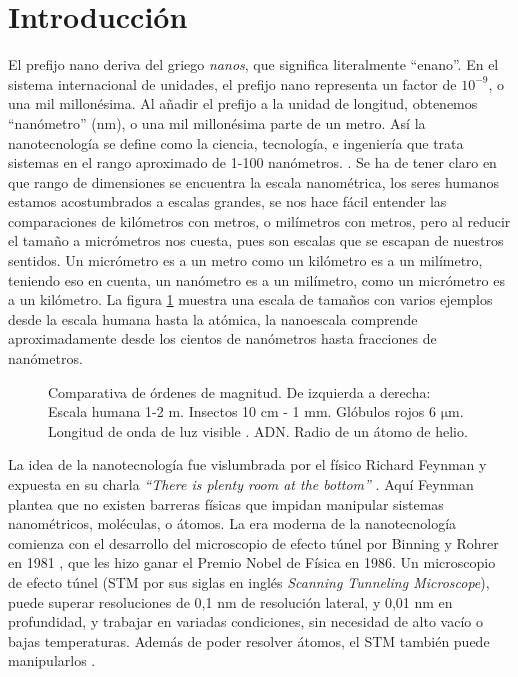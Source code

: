 \chapter*{Introducción}


El prefijo nano deriva del griego \emph{nanos}, que significa literalmente ``enano''. En el sistema internacional de unidades, el prefijo nano representa un factor de $\mathrm{10^{-9}}$, o una mil millonésima. Al añadir el prefijo a la unidad de longitud, obtenemos ``nanómetro'' (nm), o una mil millonésima parte de un metro. Así la nanotecnología se define como la ciencia, tecnología, e ingeniería que trata sistemas en el rango aproximado de 1-100 nanómetros. \citep{Haick2013,Gressler2013}. Se ha de tener claro en que rango de dimensiones se encuentra la escala nanométrica, los seres humanos estamos acostumbrados a escalas grandes, se nos hace fácil entender las comparaciones de kilómetros con metros, o milímetros con metros, pero al reducir el tamaño a micrómetros nos cuesta, pues son escalas que se escapan de nuestros sentidos. Un micrómetro es a un metro como un kilómetro es a un milímetro, teniendo eso en cuenta, un nanómetro es a un milímetro, como un micrómetro es a un kilómetro. La figura \ref{fig:scale} muestra una escala de tamaños con varios ejemplos desde la escala humana hasta la atómica, la nanoescala comprende aproximadamente desde los cientos de nanómetros hasta fracciones de nanómetros.

\begin{figure}[h!]
	\centering
	\label{fig:scale}
	\caption[Comparativa de ódenes de magnitud de metros a picometros]{Comparativa de órdenes de magnitud. De izquierda a derecha: Escala humana 1-2 m. Insectos 10 cm - 1 mm. Glóbulos rojos 6 $\mathrm{\mu}$m. Longitud de onda de luz visible . ADN. Radio de un átomo de helio.}
\end{figure}

La idea de la nanotecnología fue vislumbrada por el físico Richard Feynman y expuesta en su charla \emph{``There is plenty room at the bottom''} \citep{Feynman1960}. Aquí Feynman plantea que no existen barreras físicas que impidan manipular sistemas nanométricos, moléculas, o átomos. La era moderna de la nanotecnología comienza con el desarrollo del microscopio de efecto túnel por Binning y Rohrer en 1981 \citep{Binnig1982}, que les hizo ganar el Premio Nobel de Física en 1986. Un microscopio de efecto túnel (STM por sus siglas en inglés \emph{Scanning Tunneling Microscope}), puede superar resoluciones de 0,1 nm de resolución lateral, y 0,01 nm en profundidad, y trabajar en variadas condiciones, sin necesidad de alto vacío o bajas temperaturas. Además de poder resolver átomos, el STM también puede manipularlos \citep{Chen2008}.

